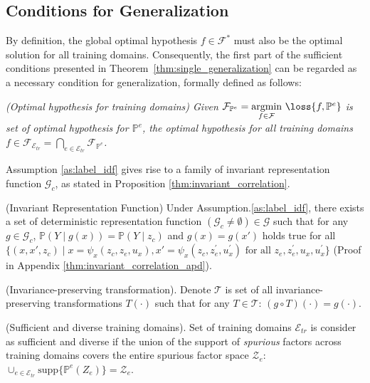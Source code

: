 \subsection{Conditions for Generalization}

By definition, the global optimal hypothesis $f\in \mathcal{F}^*$ must also be the optimal solution for all training domains.  Consequently, the first part of the sufficient conditions presented in Theorem~\ref{thm:single_generalization} can be regarded as a necessary condition for generalization, formally defined as follows:




\begin{definition} \textit{(Optimal hypothesis for training domains) Given  $\mathcal{F}_{\mathbb{P}^e}=\underset{f\in \mathcal{F}}{\text{argmin}} \ \loss{f,\mathbb{P}^{e}}$ is set of optimal hypothesis for $\mathbb{P}^{e}$, the optimal hypothesis for all training domains $f\in\mathcal{F}_{\mathcal{E}_{tr}} = \bigcap_{{e}\in \mathcal{E}_{tr}}\mathcal{F}_{\mathbb{P}^e}$.}
\label{def:joint_optimal}
\end{definition}

Assumption \ref{as:label_idf} gives rise to a family of invariant representation function $\mathcal{G}_c$, as stated in Proposition \ref{thm:invariant_correlation}. 

\begin{proposition} (Invariant Representation Function)
Under Assumption.\ref{as:label_idf}, there exists a set of deterministic representation function $(\mathcal{G}_c\neq \emptyset)\in \mathcal{G}$ such that for any $g\in \mathcal{G}_c$, $\mathbb{P}(Y\mid g(x)) = \mathbb{P}(Y\mid z_c)$ and $g(x)=g(x')$ holds true for all $\{(x,x',z_c)\mid  x= \psi_x(z_c, z_e, u_x), x'= \psi_x(z_c, z^{'}_e, u^{'}_x) \text{ for all }z_e,z^{'}_e, u_x, u^{'}_x\}$ (Proof in
Appendix \ref{thm:invariant_correlation_apd}).   
\label{thm:invariant_correlation}
\end{proposition}


\begin{definition} (Invariance-preserving  transformation). Denote $\mathcal{T}$ is set of all invariance-preserving  transformations  $T(\cdot)$ such that for any $T\in \mathcal{T}$: $(g\circ T)(\cdot)=g(\cdot)$.
\label{def:causal_transformation}
\end{definition}

\begin{definition} (Sufficient and diverse training domains). Set of training domains $\mathcal{E}_{tr}$ is consider as sufficient and diverse if  the union of the support of \textit{spurious} factors across training domains covers the entire spurious factor space $\mathcal{Z}_e$: $\cup_{e\in \mathcal{E}_{tr}}\text{supp}\{\mathbb{P}^{e} \left (Z_e \right )\}=\mathcal{Z}_e$. 
\label{as:sufficient_spurious_support}
\end{definition}

